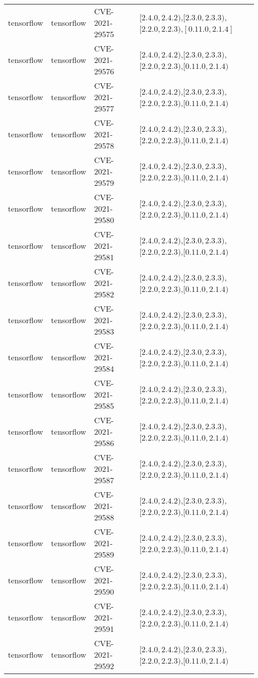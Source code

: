 \begin{tabular}{llll}
tensorflow & tensorflow & CVE-2021-29575 & $[2.4.0,2.4.2)$,$[2.3.0,2.3.3)$,$[2.2.0,2.2.3)$,$[0.11.0,2.1.4]$ \\
tensorflow & tensorflow & CVE-2021-29576 & $[2.4.0,2.4.2)$,$[2.3.0,2.3.3)$,$[2.2.0,2.2.3)$,$[0.11.0,2.1.4)$ \\
tensorflow & tensorflow & CVE-2021-29577 & $[2.4.0,2.4.2)$,$[2.3.0,2.3.3)$,$[2.2.0,2.2.3)$,$[0.11.0,2.1.4)$ \\
tensorflow & tensorflow & CVE-2021-29578 & $[2.4.0,2.4.2)$,$[2.3.0,2.3.3)$,$[2.2.0,2.2.3)$,$[0.11.0,2.1.4)$ \\
tensorflow & tensorflow & CVE-2021-29579 & $[2.4.0,2.4.2)$,$[2.3.0,2.3.3)$,$[2.2.0,2.2.3)$,$[0.11.0,2.1.4)$ \\
tensorflow & tensorflow & CVE-2021-29580 & $[2.4.0,2.4.2)$,$[2.3.0,2.3.3)$,$[2.2.0,2.2.3)$,$[0.11.0,2.1.4)$ \\
tensorflow & tensorflow & CVE-2021-29581 & $[2.4.0,2.4.2)$,$[2.3.0,2.3.3)$,$[2.2.0,2.2.3)$,$[0.11.0,2.1.4)$ \\
tensorflow & tensorflow & CVE-2021-29582 & $[2.4.0,2.4.2)$,$[2.3.0,2.3.3)$,$[2.2.0,2.2.3)$,$[0.11.0,2.1.4)$ \\
tensorflow & tensorflow & CVE-2021-29583 & $[2.4.0,2.4.2)$,$[2.3.0,2.3.3)$,$[2.2.0,2.2.3)$,$[0.11.0,2.1.4)$ \\
tensorflow & tensorflow & CVE-2021-29584 & $[2.4.0,2.4.2)$,$[2.3.0,2.3.3)$,$[2.2.0,2.2.3)$,$[0.11.0,2.1.4)$ \\
tensorflow & tensorflow & CVE-2021-29585 & $[2.4.0,2.4.2)$,$[2.3.0,2.3.3)$,$[2.2.0,2.2.3)$,$[0.11.0,2.1.4)$ \\
tensorflow & tensorflow & CVE-2021-29586 & $[2.4.0,2.4.2)$,$[2.3.0,2.3.3)$,$[2.2.0,2.2.3)$,$[0.11.0,2.1.4)$ \\
tensorflow & tensorflow & CVE-2021-29587 & $[2.4.0,2.4.2)$,$[2.3.0,2.3.3)$,$[2.2.0,2.2.3)$,$[0.11.0,2.1.4)$ \\
tensorflow & tensorflow & CVE-2021-29588 & $[2.4.0,2.4.2)$,$[2.3.0,2.3.3)$,$[2.2.0,2.2.3)$,$[0.11.0,2.1.4)$ \\
tensorflow & tensorflow & CVE-2021-29589 & $[2.4.0,2.4.2)$,$[2.3.0,2.3.3)$,$[2.2.0,2.2.3)$,$[0.11.0,2.1.4)$ \\
tensorflow & tensorflow & CVE-2021-29590 & $[2.4.0,2.4.2)$,$[2.3.0,2.3.3)$,$[2.2.0,2.2.3)$,$[0.11.0,2.1.4)$ \\
tensorflow & tensorflow & CVE-2021-29591 & $[2.4.0,2.4.2)$,$[2.3.0,2.3.3)$,$[2.2.0,2.2.3)$,$[0.11.0,2.1.4)$ \\
tensorflow & tensorflow & CVE-2021-29592 & $[2.4.0,2.4.2)$,$[2.3.0,2.3.3)$,$[2.2.0,2.2.3)$,$[0.11.0,2.1.4)$ \\

\end{tabular}
